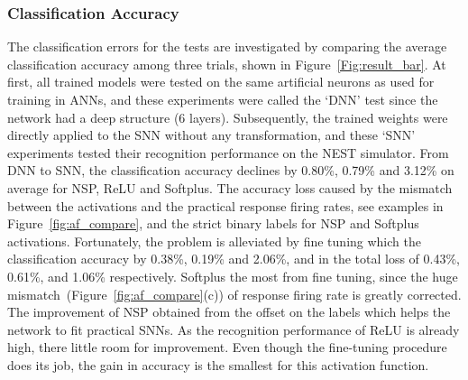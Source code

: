 	\subsubsection{Classification Accuracy}
	The classification errors for the tests are investigated by comparing the average classification accuracy among three trials, shown in Figure~\ref{Fig:result_bar}.
	At first, all trained models were tested on the same artificial neurons as used for training in ANNs, and these experiments were called the `DNN' test since the network had a deep structure (6 layers).
	Subsequently, the trained weights were directly applied to the SNN without any transformation, and these `SNN' experiments tested their recognition performance on the NEST simulator.
	From DNN to SNN, the classification accuracy declines by 0.80\%, 0.79\% and 3.12\% on average for NSP, ReLU and Softplus.
	The accuracy loss \DIFdelbegin {}\DIFdelend \DIFaddbegin {}\DIFaddend caused by the mismatch between the activations and the practical response firing rates, see examples in Figure~\ref{fig:af_compare}, and the strict binary labels for NSP and Softplus activations.
	Fortunately, the problem is alleviated by fine tuning which \DIFdelbegin {}\DIFdelend \DIFaddbegin {}\DIFaddend the classification accuracy by 0.38\%, 0.19\% and 2.06\%, and \DIFdelbegin {}\DIFdelend \DIFaddbegin {}\DIFaddend in the total loss of 0.43\%, 0.61\%, and 1.06\% respectively.
	Softplus \DIFdelbegin {}\DIFdelend \DIFaddbegin {}\DIFaddend the most from fine tuning, since the huge mismatch~(Figure~\ref{fig:af_compare}(c)) of response firing rate is greatly corrected.
	The improvement of NSP \DIFdelbegin {}\DIFdelend \DIFaddbegin {}\DIFaddend obtained from the offset on the labels which helps the network to fit practical SNNs.
	As the recognition performance of ReLU is already high, there \DIFdelbegin {}\DIFdelend \DIFaddbegin {}\DIFaddend little room for improvement.
	Even though the fine-tuning procedure does its job, the gain in accuracy is the smallest for this activation function.



